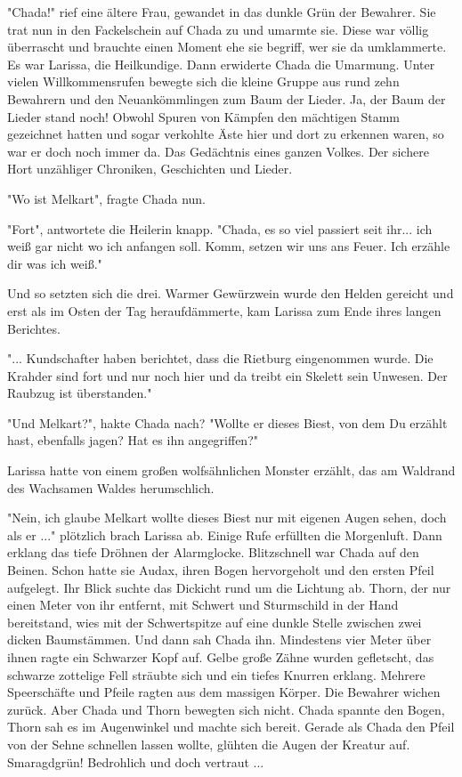 \documentclass[10pt, a4paper, oneside]{book}
\begin{document}
\begin{multicols}{2}
"Chada!" rief eine ältere Frau, gewandet in das dunkle Grün der Bewahrer. Sie trat nun in den Fackelschein auf Chada zu und umarmte sie. Diese war völlig überrascht und brauchte einen Moment ehe sie begriff, wer sie da umklammerte. Es war Larissa, die Heilkundige. Dann erwiderte Chada die Umarmung. Unter vielen Willkommensrufen bewegte sich die kleine Gruppe aus rund zehn Bewahrern und den Neuankömmlingen zum Baum der Lieder. Ja, der Baum der Lieder stand noch! Obwohl Spuren von Kämpfen den mächtigen Stamm gezeichnet hatten und sogar verkohlte Äste hier und dort zu erkennen waren, so war er doch noch immer da. Das Gedächtnis eines ganzen Volkes. Der sichere Hort unzähliger Chroniken, Geschichten und Lieder.

"Wo ist Melkart", fragte Chada nun.

"Fort", antwortete die Heilerin knapp. "Chada, es so viel passiert seit ihr... ich weiß gar nicht wo ich anfangen soll. Komm, setzen wir uns ans Feuer. Ich erzähle dir was ich weiß."

Und so setzten sich die drei. Warmer Gewürzwein wurde den Helden gereicht und erst als im Osten der Tag heraufdämmerte, kam Larissa zum Ende ihres langen Berichtes.

"... Kundschafter haben berichtet, dass die Rietburg eingenommen wurde. Die Krahder sind fort und nur noch hier und da treibt ein Skelett sein Unwesen. Der Raubzug ist überstanden."

"Und Melkart?", hakte Chada nach? "Wollte er dieses Biest, von dem Du erzählt hast, ebenfalls jagen? Hat es ihn angegriffen?"

Larissa hatte von einem großen wolfsähnlichen Monster erzählt, das am Waldrand des Wachsamen Waldes herumschlich.

"Nein, ich glaube Melkart wollte dieses Biest nur mit eigenen Augen sehen, doch als er ..." plötzlich brach Larissa ab. Einige Rufe erfüllten die Morgenluft. Dann erklang das tiefe Dröhnen der Alarmglocke. Blitzschnell war Chada auf den Beinen. Schon hatte sie Audax, ihren Bogen hervorgeholt und den ersten Pfeil aufgelegt. Ihr Blick suchte das Dickicht rund um die Lichtung ab. Thorn, der nur einen Meter von ihr entfernt, mit Schwert und Sturmschild in der Hand bereitstand, wies mit der Schwertspitze auf eine dunkle Stelle zwischen zwei dicken Baumstämmen. Und dann sah Chada ihn. Mindestens vier Meter über ihnen ragte ein Schwarzer Kopf auf. Gelbe große Zähne wurden gefletscht, das schwarze zottelige Fell sträubte sich und ein tiefes Knurren erklang. Mehrere Speerschäfte und Pfeile ragten aus dem massigen Körper. Die Bewahrer wichen zurück. Aber Chada und Thorn bewegten sich nicht. Chada spannte den Bogen, Thorn sah es im Augenwinkel und machte sich bereit. Gerade als Chada den Pfeil von der Sehne schnellen lassen wollte, glühten die Augen der Kreatur auf. Smaragdgrün! Bedrohlich und doch vertraut ...


\end{multicols}
\end{document}
